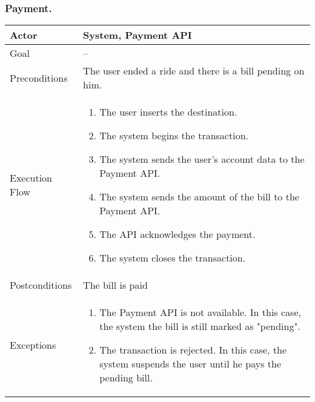 \documentclass[english]{article}
\begin{document}
			\subsubsection{Payment.}
			\begin{tabularx}{\textwidth}{  l  X  }
				\hline
				Actor & System, Payment API\\
				\hline
				Goal & --\\
				\hline
				Preconditions & The user ended a ride and there is a bill pending on him.\\
				\hline
				Execution Flow & \begin{enumerate}
					\item{The user inserts the destination.}
					\item{The system begins the transaction.}
					\item{The system sends the user's account data to the Payment API.}
					\item{The system sends the amount of the bill to the Payment API.}
					\item{The API acknowledges the payment.}
					\item{The system closes the transaction.}
				\end{enumerate}\\
				\hline
				Postconditions & The bill is paid\\
				\hline
				Exceptions & \begin{enumerate}
					\item{The Payment API is not available. In this case, the system the bill is still marked as "pending".}
					\item{The transaction is rejected. In this case, the system suspends the user until he pays the pending bill.}
				\end{enumerate}\\
				\hline
			\end{tabularx}
			
\end{document}
